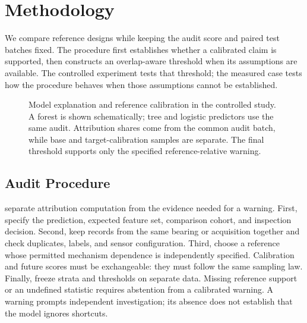 \documentclass[conference]{IEEEtran}
\begin{document}
\section{Methodology}
\label{sec:method}
We compare reference designs while keeping the audit score and paired test batches fixed. The procedure first establishes whether a calibrated claim is supported, then constructs an overlap-aware threshold when its assumptions are available. The controlled experiment tests that threshold; the measured case tests how the procedure behaves when those assumptions cannot be established.

\begin{figure}[t]
\centering

\caption{Model explanation and reference calibration in the controlled study. A forest is shown schematically; tree and logistic predictors use the same audit. Attribution shares come from the common audit batch, while base and target-calibration samples are separate. The final threshold supports only the specified reference-relative warning.}
\label{fig:workflow}
\end{figure}

\subsection{Audit Procedure}
 separate attribution computation from the evidence needed for a warning. First, specify the prediction, expected feature set, comparison cohort, and inspection decision. Second, keep records from the same bearing or acquisition together and check duplicates, labels, and sensor configuration. Third, choose a reference whose permitted mechanism dependence is independently specified. Calibration and future scores must be exchangeable: they must follow the same sampling law. Finally, freeze strata and thresholds on separate data. Missing reference support or an undefined statistic requires abstention from a calibrated warning. A warning prompts independent investigation; its absence does not establish that the model ignores shortcuts.
\end{document}
